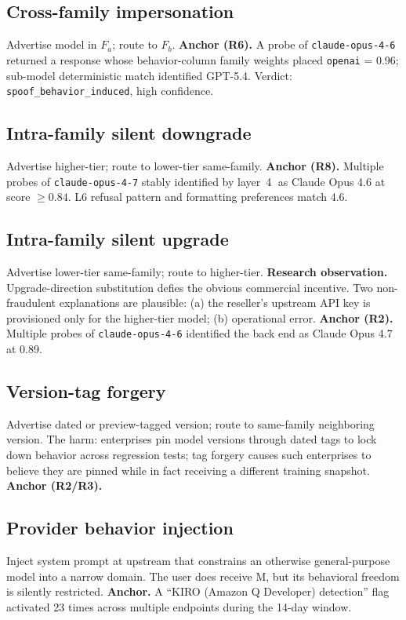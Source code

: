 \documentclass[10pt,a4paper,twocolumn]{article}
\begin{document}
\subsection{Cross-family impersonation}
Advertise model in $F_a$; route to $F_b$. \textbf{Anchor (R6).} A probe of
\texttt{claude-opus-4-6} returned a response whose behavior-column family
weights placed \texttt{openai} = 0.96; sub-model deterministic match identified
GPT-5.4. Verdict: \texttt{spoof\_behavior\_induced}, high confidence.

\subsection{Intra-family silent downgrade}
Advertise higher-tier; route to lower-tier same-family. \textbf{Anchor (R8).}
Multiple probes of \texttt{claude-opus-4-7} stably identified by
layer~\textcircled{4} as Claude Opus 4.6 at score $\geq 0.84$. L6 refusal
pattern and formatting preferences match 4.6.

\subsection{Intra-family silent upgrade}
Advertise lower-tier same-family; route to higher-tier. \textbf{Research
observation.} Upgrade-direction substitution defies the obvious commercial
incentive. Two non-fraudulent explanations are plausible: (a) the reseller's
upstream API key is provisioned only for the higher-tier model; (b)
operational error. \textbf{Anchor (R2).} Multiple probes of
\texttt{claude-opus-4-6} identified the back end as Claude Opus 4.7 at 0.89.

\subsection{Version-tag forgery}
Advertise dated or preview-tagged version; route to same-family neighboring
version. The harm: enterprises pin model versions through dated tags to lock
down behavior across regression tests; tag forgery causes such enterprises to
believe they are pinned while in fact receiving a different training snapshot.
\textbf{Anchor (R2/R3).}

\subsection{Provider behavior injection}
Inject system prompt at upstream that constrains an otherwise general-purpose
model into a narrow domain. The user does receive M, but its behavioral
freedom is silently restricted. \textbf{Anchor.} A ``KIRO (Amazon Q
Developer) detection'' flag activated 23 times across multiple endpoints
during the 14-day window.
\end{document}
